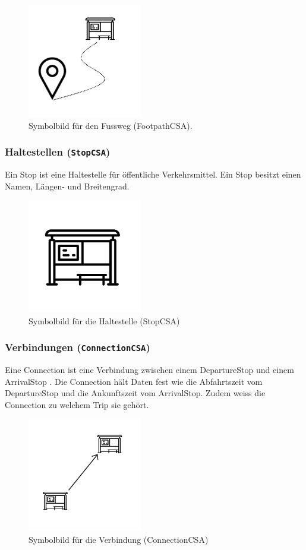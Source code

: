 \begin{figure}[htb]
	\centering
	\includegraphics[width=5cm]{img/footpath.png}
	\caption{Symbolbild für den Fussweg (FootpathCSA).}
	\label{fig:footpath}
\end{figure}


\subsubsection{Haltestellen (\texttt{StopCSA})}

Ein Stop ist eine \hypertarget{stop}{Haltestelle} für öffentliche Verkehrsmittel. Ein Stop besitzt einen Namen, Längen- und Breitengrad. 

\begin{figure}[htb]
	\centering
	\includegraphics[width=5cm]{img/stop.png}
	\caption{Symbolbild für die Haltestelle (StopCSA)\cite{stop-pic}}
	\label{fig:stop}
\end{figure}

\subsubsection{Verbindungen (\texttt{ConnectionCSA})}

Eine Connection ist eine \hypertarget{connection}{Verbindung} zwischen einem DepartureStop und einem ArrivalStop . Die Connection hält Daten fest wie die Abfahrtszeit vom DepartureStop und die Ankunftszeit vom ArrivalStop. Zudem weiss die Connection zu welchem Trip sie gehört.

\begin{figure}[htb]
	\centering
	\includegraphics[width=5cm]{img/connection.png}
	\caption{Symbolbild für die Verbindung (ConnectionCSA)}
	\label{fig:connection}
\end{figure} 

